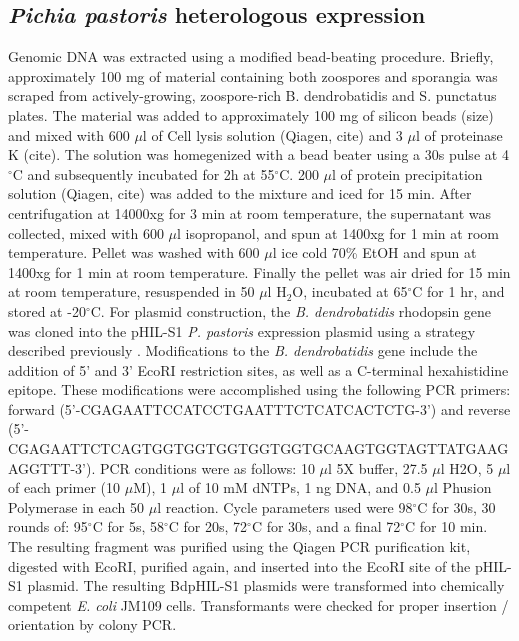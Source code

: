 \subsection{\textit{Pichia pastoris} heterologous expression}
Genomic DNA was extracted using a modified bead-beating procedure. Briefly, approximately 100 mg of material containing both zoospores and sporangia was scraped from actively-growing, zoospore-rich B. dendrobatidis and S. punctatus plates. The material was added to approximately 100 mg of silicon beads (size) and mixed with 600 $\mu$l of Cell lysis solution (Qiagen, cite) and 3 $\mu$l of proteinase K (cite). The solution was homegenized with a bead beater using a 30s pulse at 4$^{\circ}$C and subsequently incubated for 2h at 55$^{\circ}$C. 200 $\mu$l of protein precipitation solution (Qiagen, cite) was added to the mixture and iced for 15 min. After centrifugation at 14000xg for 3 min at room temperature, the supernatant was collected, mixed with 600 $\mu$l isopropanol, and spun at 1400xg for 1 min at room temperature. Pellet was washed with 600 $\mu$l ice cold 70\% EtOH and spun at 1400xg for 1 min at room temperature. Finally the pellet was air dried for 15 min at room temperature, resuspended in 50 $\mu$l H$_{2}$O, incubated at 65$^{\circ}$C for 1 hr, and stored at -20$^{\circ}$C.
\indent For plasmid construction, the \textit{B. dendrobatidis} rhodopsin gene was cloned into the pHIL-S1 \textit{P. pastoris} expression plasmid using a strategy described previously \cite{Bieszke1999}.  Modifications to the \textit{B. dendrobatidis} gene include the addition of 5' and 3' EcoRI restriction sites, as well as a C-terminal hexahistidine epitope. These modifications were accomplished using the following PCR primers: forward (5'-CGAGAATTCCATCCTGAATTTCTCATCACTCTG-3') and reverse (5'-CGAGAATTCTCAGTGGTGGTGGTGGTGGTGCAAGTGGTAGTTATGAAGAGGTTT-3'). PCR conditions were as follows: 10 $\mu$l 5X buffer, 27.5 $\mu$l H2O, 5 $\mu$l of each primer (10 $\mu$M), 1 $\mu$l of 10 mM dNTPs, 1 ng DNA, and 0.5 $\mu$l Phusion Polymerase in each 50 $\mu$l reaction. Cycle parameters used were 98$^{\circ}$C for 30s, 30 rounds of: 95$^{\circ}$C for 5s, 58$^{\circ}$C for 20s, 72$^{\circ}$C for 30s, and a final 72$^{\circ}$C for 10 min. The resulting fragment was purified using the Qiagen PCR purification kit, digested with EcoRI, purified again, and inserted into the EcoRI site of the pHIL-S1 plasmid. The resulting BdpHIL-S1 plasmids were transformed into chemically competent \textit{E. coli} JM109 cells. Transformants were checked for proper insertion / orientation by colony PCR.\\ 
